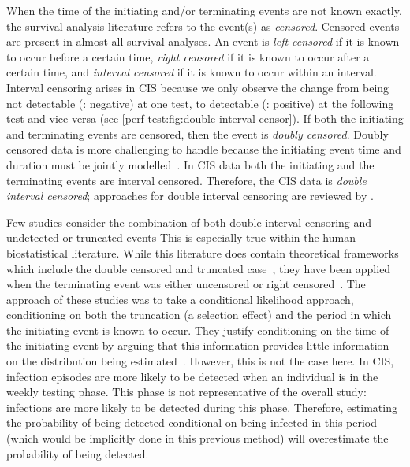 \documentclass[thesis.tex]{subfiles}
\begin{document}
When the time of the initiating and/or terminating events are not known exactly, the survival analysis literature refers to the event(s) as \emph{censored}.
Censored events are present in almost all survival analyses.
An event is \emph{left censored} if it is known to occur before a certain time, \emph{right censored} if it is known to occur after a certain time, and \emph{interval censored} if it is known to occur within an interval.
Interval censoring arises in CIS because we only observe the change from being not detectable (\ie: negative) at one test, to detectable (\ie: positive) at the following test and vice versa (see \cref{perf-test:fig:double-interval-censor}).
If both the initiating and terminating events are censored, then the event is \emph{doubly censored}.
Doubly censored data is more challenging to handle because the initiating event time and duration must be jointly modelled~\autocite[and references therein]{liSemiparametric}.
In CIS data both the initiating and the terminating events are interval censored.
Therefore, the CIS data is \emph{double interval censored}; approaches for double interval censoring are reviewed by \textcite{sunAnalysis,bogaertsSurvival}.

Few studies consider the combination of both double interval censoring and undetected or truncated events
This is especially true within the human biostatistical literature.
While this literature does contain theoretical frameworks which include the double censored and truncated case~\autocites{turnbullEmpirical}{dempsterMaximum}, they have been applied when the terminating event was either uncensored or right censored~\autocite{sunEmpirical,bacchettiNonparametric}.
The approach of these studies \autocite[and elsewhere, e.g.:][]{shenNonparametric} was to take a conditional likelihood approach, conditioning on both the truncation (a selection effect) and the period in which the initiating event is known to occur.
They justify conditioning on the time of the initiating event by arguing that this information provides little information on the distribution being estimated~.
However, this is not the case here.
In CIS, infection episodes are more likely to be detected when an individual is in the weekly testing phase.
This phase is not representative of the overall study: infections are more likely to be detected during this phase.
Therefore, estimating the probability of being detected conditional on being infected in this period (which would be implicitly done in this previous method)  will overestimate the probability of being detected.
\end{document}
